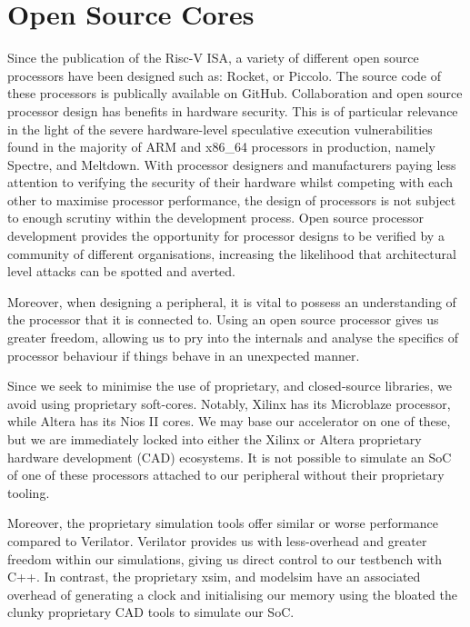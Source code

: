 \documentclass[a4paper,8pt]{report}
\begin{document}
\section{Open Source Cores}
Since the publication of the Risc-V ISA, a variety of different open source
processors have been designed such as: Rocket\cite{rocket}, or
Piccolo\cite{piccolo}. The source code of these processors is publically
available on GitHub. Collaboration and open source processor design has benefits
in hardware security. This is of particular relevance in the light of the severe
hardware-level speculative execution vulnerabilities found in the majority of
ARM and x86\_64 processors in production, namely Spectre\cite{spectre}, and
Meltdown\cite{meltdown}. With processor designers and manufacturers paying less
attention to verifying the security of their hardware whilst competing with each
other to maximise processor performance, the design of processors is not subject
to enough scrutiny within the development process. Open source processor
development provides the opportunity for processor designs to be verified by a
community of different organisations, increasing the likelihood that
architectural level attacks can be spotted and averted.

Moreover, when designing a peripheral, it is vital to possess an understanding
of the processor that it is connected to. Using an open source processor gives
us greater freedom, allowing us to pry into the internals and analyse the
specifics of processor behaviour if things behave in an unexpected manner.

Since we seek to minimise the use of proprietary, and closed-source libraries,
we avoid using proprietary soft-cores. Notably, Xilinx has its Microblaze
processor, while Altera has its Nios II cores. We may base our accelerator on
one of these, but we are immediately locked into either the Xilinx or Altera
proprietary hardware development (CAD) ecosystems. It is not possible to
simulate an SoC of one of these processors attached to our peripheral without
their proprietary tooling.

Moreover, the proprietary simulation tools offer similar or worse performance
compared to Verilator. Verilator provides us with less-overhead and greater
freedom within our simulations, giving us direct control to our testbench with
C++. In contrast, the proprietary xsim, and modelsim have an associated overhead
of generating a clock and initialising our memory using the bloated the clunky
proprietary CAD tools to simulate our SoC.
\end{document}
